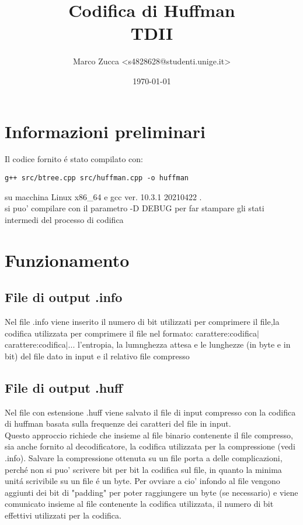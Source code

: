 \documentclass{article}
\title{Codifica di Huffman \\ TDII} %
\author{
Marco Zucca \textless s4828628@studenti.unige.it\textgreater\\
}
\date{\today} %
\begin{document}
\maketitle %
\section{Informazioni preliminari}

Il codice fornito \'e stato compilato con: \begin{verbatim}
g++ src/btree.cpp src/huffman.cpp -o huffman
\end{verbatim} 
su macchina Linux x86\_64 e gcc ver. 10.3.1 20210422 . \\
si puo' compilare con il parametro -D DEBUG per far stampare gli stati 
intermedi del processo di codifica

\section{Funzionamento}
\subsection{File di output .info}
Nel file .info viene inserito il numero di bit utilizzati per comprimere il
file,la codifica utilizzata per comprimere il file nel formato:
carattere:codifica$|$carattere:codifica$|$...
l'entropia, la lumnghezza attesa e le lunghezze (in byte e in bit) del file dato in input e il relativo file compresso

\subsection{File di output .huff}
Nel file con estensione .huff viene salvato il file di input compresso con la codifica di huffman basata sulla frequenze dei caratteri del file in input.\\
Questo approccio richiede che insieme al file binario contenente il file compresso, sia anche fornito al decodificatore, la codifica utilizzata per la compressione (vedi .info).
Salvare la compressione ottenuta su un file porta a delle complicazioni, perch\'e non si puo' scrivere bit per bit la codifica sul file, in quanto la minima unit\'a scrivibile su un file \'e un byte.
Per ovviare a cio' infondo al file vengono aggiunti dei bit di "padding" per poter raggiungere un byte (se necessario) e viene comunicato insieme al file contenente la codifica utilizzata, il numero di bit effettivi utilizzati per la codifica.
\end{document}
